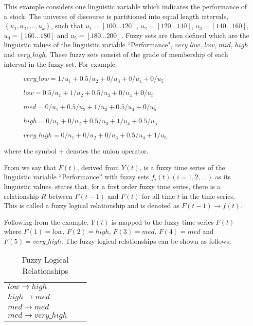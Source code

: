 \documentclass{article}
\theoremstyle{definition}
\begin{document}
This example considers one linguistic variable which indicates the performance of a stock. The universe of discourse is partitioned into equal length intervals, $\left\{u_1, u_2,\ldots,u_k\right\}$, such that $u_1 = [100 \ldots 120]$, $u_2 = [120 \ldots 140]$, $u_3 = [140 \ldots 160]$, $u_4 = [160 \ldots 180]$ and $u_5 = [180 \ldots 200]$. Fuzzy sets are then defined which are the linguistic values of the linguistic variable ``Performance", $very\_low$, $low$, $mid$, $high$ and $very\_high$. These fuzzy sets consist of the grade of membership of each interval in the fuzzy set. For example:
\begin{description}
\item[] $very\_low = 1/u_1 + 0.5/u_2 + 0/u_3 + 0/u_4 + 0/u_5$
\item[] $low = 0.5/u_1 + 1/u_2 + 0.5/u_3 + 0/u_4 + 0/u_5$
\item[] $med = 0/u_1 + 0.5/u_2 + 1/u_3 + 0.5/u_4 + 0/u_5$
\item[] $high = 0/u_1 + 0/u_2 + 0.5/u_3 + 1/u_4 + 0.5/u_5$
\item[] $very\_high = 0/u_1 + 0/u_2 + 0/u_3 + 0.5/u_4 + 1/u_5$
\end{description}
where the symbol $+$ denotes the union operator.

From  we say that $F(t)$, derived from $Y(t)$, is a fuzzy time series of the linguistic variable ``Performance'' with fuzzy sets $f_i(t) (i=1,2,\ldots)$ as its linguistic values.  states that, for a first order fuzzy time series, there is a relationship $R$ between $F(t-1)$ and $F(t)$ for all time $t$ in the time series. This is called a fuzzy logical relationship and is denoted as $F(t-1) \rightarrow f(t)$.

Following from the example, $Y(t)$ is mapped to the fuzzy time series $F(t)$ where $F(1)=low$, $F(2)=high$, $F(3)=med$, $F(4)=med$ and $F(5)=very\_high$. The fuzzy logical relationships can be shown as follows: 

\begin{table}[h]
	\center
	\begin{tabular}{ l l l }
  	$low \rightarrow high$  \\
  	$high \rightarrow med$ \\
  	$med \rightarrow med$ \\
  	$med \rightarrow very\_high$ \\
	\end{tabular}
	\caption{Fuzzy Logical Relationships}
\end{table}
\end{document}
